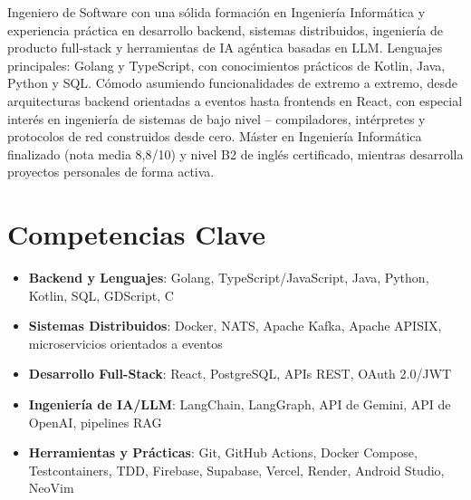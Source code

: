 \documentclass[11pt,a4paper,sans]{moderncv}
\begin{document}
\makecvtitle


\vspace{6pt}
\small{Ingeniero de Software con una sólida formación en Ingeniería Informática y experiencia práctica en desarrollo backend, sistemas distribuidos, ingeniería de producto full-stack y herramientas de IA agéntica basadas en LLM. Lenguajes principales: Golang y TypeScript, con conocimientos prácticos de Kotlin, Java, Python y SQL. Cómodo asumiendo funcionalidades de extremo a extremo, desde arquitecturas backend orientadas a eventos hasta frontends en React, con especial interés en ingeniería de sistemas de bajo nivel -- compiladores, intérpretes y protocolos de red construidos desde cero. Máster en Ingeniería Informática finalizado (nota media 8,8/10) y nivel B2 de inglés certificado, mientras desarrolla proyectos personales de forma activa.}


\section{Competencias Clave}
\vspace{1pt}
\begin{itemize}

\item \textbf{Backend y Lenguajes}: Golang, TypeScript/JavaScript, Java, Python, Kotlin, SQL, GDScript, C

\item \textbf{Sistemas Distribuidos}: Docker, NATS, Apache Kafka, Apache APISIX, microservicios orientados a eventos

\item \textbf{Desarrollo Full-Stack}: React, PostgreSQL, APIs REST, OAuth 2.0/JWT

\item \textbf{Ingeniería de IA/LLM}: LangChain, LangGraph, API de Gemini, API de OpenAI, pipelines RAG

\item \textbf{Herramientas y Prácticas}: Git, GitHub Actions, Docker Compose, Testcontainers, TDD, Firebase, Supabase, Vercel, Render, Android Studio, NeoVim

\end{itemize}
\end{document}
